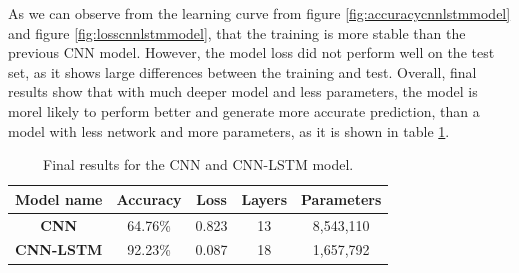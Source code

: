 As we can observe from the learning curve from figure \ref{fig:accuracycnnlstmmodel} and figure \ref{fig:losscnnlstmmodel}, that the training is more stable than the previous CNN model. However, the model loss did not perform well on the test set, as it shows large differences between the training and test. Overall, final results show that with much deeper model and less parameters, the model is morel likely to perform better and generate more accurate prediction, than a model with less network and more parameters, as it is shown in table \ref{table:finalresults}.
\begin{table}[ht]
\caption{Final results for the CNN and CNN-LSTM model.}
\centering
\begin{tabular}{|c|c|c|c|c|}
\hline
\textbf{Model name} & \textbf{Accuracy} & \textbf{Loss} & \textbf{Layers} & \textbf{Parameters} \\ \hline
\textbf{CNN} & 64.76\% & 0.823 & 13 & 8,543,110 \\ \hline
\textbf{CNN-LSTM} & 92.23\% & 0.087 & 18 & 1,657,792 \\ \hline
\end{tabular}

\label{table:finalresults}
\end{table}\\


